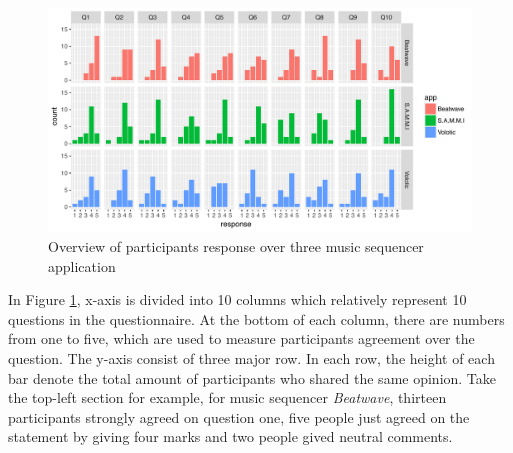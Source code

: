 \bigskip
\begin{figure}[h]
 \centering
 \includegraphics[width = \textwidth]{images/questionnaire-responses.pdf}
 \caption{Overview of participants response over three music sequencer application}
 \label{fig: questionnaire}
\end{figure}

In Figure \ref{fig: questionnaire}, x-axis is divided into 10 columns which relatively represent 10 questions in the questionnaire. At the bottom of each column, there are numbers from one to five, which are used to measure participants agreement over the question. The y-axis consist of three major row. In each row, the height of each bar denote the total amount of participants who shared the same opinion. Take the top-left section for example, for music sequencer \textit{Beatwave}, thirteen participants strongly agreed on question one, five people just agreed on the statement by giving four marks and two people gived neutral comments.

